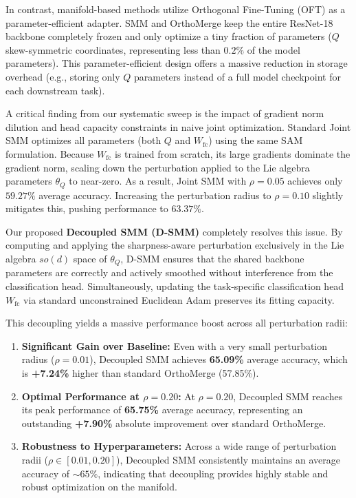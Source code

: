 \documentclass{article}
\theoremstyle{plain}
\theoremstyle{definition}
\theoremstyle{remark}
\begin{document}
In contrast, manifold-based methods utilize Orthogonal Fine-Tuning (OFT) as a parameter-efficient adapter. SMM and OrthoMerge keep the entire ResNet-18 backbone completely frozen and only optimize a tiny fraction of parameters ($Q$ skew-symmetric coordinates, representing less than $0.2\%$ of the model parameters). This parameter-efficient design offers a massive reduction in storage overhead (e.g., storing only $Q$ parameters instead of a full model checkpoint for each downstream task).

A critical finding from our systematic sweep is the impact of gradient norm dilution and head capacity constraints in naive joint optimization. Standard Joint SMM optimizes all parameters (both $Q$ and $W_{\text{fc}}$) using the same SAM formulation. Because $W_{\text{fc}}$ is trained from scratch, its large gradients dominate the gradient norm, scaling down the perturbation applied to the Lie algebra parameters $\theta_Q$ to near-zero. As a result, Joint SMM with $\rho = 0.05$ achieves only $59.27\%$ average accuracy. Increasing the perturbation radius to $\rho = 0.10$ slightly mitigates this, pushing performance to $63.37\%$.

Our proposed \textbf{Decoupled SMM (D-SMM)} completely resolves this issue. By computing and applying the sharpness-aware perturbation exclusively in the Lie algebra $so(d)$ space of $\theta_Q$, D-SMM ensures that the shared backbone parameters are correctly and actively smoothed without interference from the classification head. Simultaneously, updating the task-specific classification head $W_{\text{fc}}$ via standard unconstrained Euclidean Adam preserves its fitting capacity.

This decoupling yields a massive performance boost across all perturbation radii:
\begin{enumerate}
    \item \textbf{Significant Gain over Baseline:} Even with a very small perturbation radius ($\rho = 0.01$), Decoupled SMM achieves \textbf{65.09\%} average accuracy, which is \textbf{+7.24\%} higher than standard OrthoMerge (57.85\%).
    \item \textbf{Optimal Performance at $\rho = 0.20$:} At $\rho = 0.20$, Decoupled SMM reaches its peak performance of \textbf{65.75\%} average accuracy, representing an outstanding \textbf{+7.90\%} absolute improvement over standard OrthoMerge.
    \item \textbf{Robustness to Hyperparameters:} Across a wide range of perturbation radii ($\rho \in [0.01, 0.20]$), Decoupled SMM consistently maintains an average accuracy of $\sim 65\%$, indicating that decoupling provides highly stable and robust optimization on the manifold.
\end{enumerate}
\end{document}
